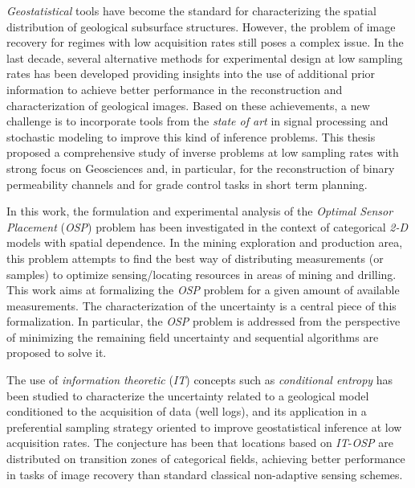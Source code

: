 \emph{Geostatistical} tools have become the standard for characterizing the spatial distribution of geological subsurface structures. However, the problem of image recovery for regimes with low acquisition rates still poses a complex issue. In the last decade, several alternative methods for experimental design at low sampling rates has been developed providing insights into the use of additional prior information to achieve better performance in the reconstruction and characterization of geological images. Based on these achievements, a new challenge is to incorporate tools from the \emph{state of art} in signal processing and stochastic modeling to improve this kind of inference problems. This thesis proposed a comprehensive study of inverse problems at low sampling rates with strong focus on Geosciences and, in particular, for the reconstruction of binary permeability channels and for grade control tasks in short term planning.


In this work, the formulation and experimental analysis of the \emph{Optimal Sensor Placement} (\emph{OSP}) problem has been investigated in the context of categorical \emph{2-D} models with spatial dependence. In the mining exploration and production area, this problem attempts to find the best way of distributing measurements (or samples) to optimize sensing/locating resources in areas of mining and drilling. This work aims at formalizing the {\emph{OSP}} problem for a given amount of available measurements. The characterization of the uncertainty is a central piece of this formalization. In particular, the \emph{OSP} problem is addressed from the perspective of minimizing the remaining field uncertainty and sequential algorithms are proposed to solve it. 

The use of \emph{information theoretic} (\emph{IT}) concepts such as \emph{conditional entropy} has been studied to characterize the uncertainty related to a geological model conditioned to the acquisition of data (well logs), and its application in a preferential sampling strategy oriented to improve geostatistical inference at low acquisition rates. The conjecture has been that locations based on \emph{IT}-\emph{OSP} are distributed on transition zones of categorical fields, achieving better performance in tasks of image recovery than standard classical non-adaptive sensing schemes.

